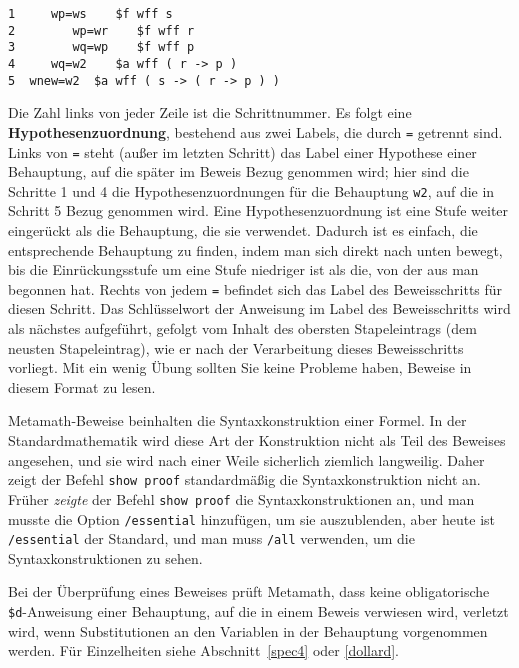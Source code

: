 \begin{verbatim}
1     wp=ws    $f wff s
2        wp=wr    $f wff r
3        wq=wp    $f wff p
4     wq=w2    $a wff ( r -> p )
5  wnew=w2  $a wff ( s -> ( r -> p ) )
\end{verbatim}

Die Zahl links von jeder Zeile ist die Schrittnummer.  Es folgt eine {\bf Hypothesenzuordnung}, bestehend aus zwei Labels, die durch \texttt{=} getrennt sind.  Links von \texttt{=} steht (außer im letzten Schritt) das Label einer Hypothese einer Behauptung, auf die später im Beweis Bezug genommen wird; hier sind die Schritte 1 und 4 die Hypothesenzuordnungen für die Behauptung \texttt{w2}, auf die in Schritt 5 Bezug genommen wird.  Eine Hypothesenzuordnung ist eine Stufe weiter eingerückt als die Behauptung, die sie verwendet. Dadurch ist es einfach, die entsprechende Behauptung zu finden, indem man sich direkt nach unten bewegt, bis die Einrückungsstufe um eine Stufe niedriger ist als die, von der aus man begonnen hat.  Rechts von jedem \texttt{=} befindet sich das Label des Beweisschritts für diesen Schritt.  Das Schlüsselwort der Anweisung im Label des Beweisschritts wird als nächstes aufgeführt, gefolgt vom Inhalt des obersten Stapeleintrags (dem neusten Stapeleintrag), wie er nach der Verarbeitung dieses Beweisschritts vorliegt.  Mit ein wenig Übung sollten Sie keine Probleme haben, Beweise in diesem Format zu lesen.

Metamath-Beweise beinhalten die Syntaxkonstruktion einer Formel. In der Standardmathematik wird diese Art der Konstruktion nicht als Teil des Beweises angesehen, und sie wird nach einer Weile sicherlich ziemlich langweilig. Daher zeigt der Befehl \texttt{show proof} standardmäßig die Syntaxkonstruktion nicht an.
Früher \textit{zeigte} der Befehl \texttt{show proof} die Syntaxkonstruktionen an, und man musste die Option 
\texttt{/essential} hinzufügen, um sie auszublenden, aber heute ist 
\texttt{/essential} der Standard, und man muss 
\texttt{/all} verwenden, um die Syntaxkonstruktionen zu sehen.

Bei der Überprüfung eines Beweises prüft Metamath, dass keine obligatorische \texttt{\$d}-Anweisung einer Behauptung, auf die in einem Beweis verwiesen wird, verletzt wird, wenn Substitutionen an den Variablen in der Behauptung vorgenommen werden.  Für Einzelheiten siehe Abschnitt~\ref{spec4} oder \ref{dollard}.

